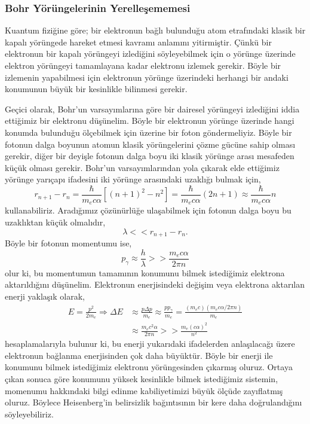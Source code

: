 \documentclass[00_kitap.tex]{subfiles}
\begin{document}
\subsubsection{Bohr Yörüngelerinin Yerelleşememesi}
Kuantum fiziğine göre; bir elektronun bağlı bulunduğu atom etrafındaki klasik bir kapalı yörüngede hareket etmesi kavramı anlamını yitirmiştir. Çünkü bir elektronun bir kapalı yörüngeyi izlediğini söyleyebilmek için o yörünge üzerinde elektron yörüngeyi tamamlayana kadar elektronu izlemek gerekir. Böyle bir izlemenin yapabilmesi için elektronun yörünge üzerindeki herhangi bir andaki konumunun büyük bir kesinlikle bilinmesi gerekir.

Geçici olarak, Bohr'un varsayımlarına göre bir dairesel yörüngeyi izlediğini iddia ettiğimiz bir elektronu düşünelim. Böyle bir elektronun yörünge üzerinde hangi konumda bulunduğu ölçebilmek için üzerine bir foton göndermeliyiz. Böyle bir fotonun dalga boyunun atomun klasik yörüngelerini çözme gücüne sahip olması gerekir, diğer bir deyişle fotonun dalga boyu iki klasik yörünge arası mesafeden küçük olması gerekir. Bohr'un varsayımlarından yola çıkarak elde ettiğimiz yörünge yarıçapı ifadesini iki yörünge arasındaki uzaklığı bulmak için,
\begin{equation*}
r _ { n + 1 } - r _ { n } = \frac { \hbar } { m _ { e } c \alpha } \left[ ( n + 1 ) ^ { 2 } - n ^ { 2 } \right] = \frac { \hbar } { m _ { e } c \alpha } (2n+1) \approx \frac { \hbar } { m _ { e } c \alpha } n
\end{equation*}
kullanabiliriz. Aradığımız çözünürlüğe ulaşabilmek için fotonun dalga boyu bu uzaklıktan küçük olmalıdır,
\begin{equation*}
\lambda << r _ { n + 1 } - r _ { n }.
\end{equation*}
Böyle bir fotonun momentumu ise,
\begin{equation*}
p_{ \gamma } \approx \frac { h } { \lambda } >> \frac { m _ { e } c \alpha } { 2\pi n }
\end{equation*}
olur ki, bu momentumun tamamının konumunu bilmek istediğimiz elektrona aktarıldığını düşünelim. Elektronun enerjisindeki değişim veya elektrona aktarılan enerji yaklaşık olarak,
\begin{align*}
E = \frac{p^2}{2m_e} \Rightarrow \Delta E &\approx \frac { p \Delta p } { m _ { e } } \approx \frac { p p _ { \gamma } } { m _ { e } } = \frac{(m_e c) (m_e c \alpha/2\pi n)}{m_e}\\
&\approx \frac { m_e c^2 \alpha} { 2\pi n } >> \frac { m _ { e } ( c \alpha ) ^ { 2 } } { n ^ { 2 } }
\end{align*}
hesaplamalarıyla bulunur ki, bu enerji yukarıdaki ifadelerden anlaşılacağı üzere elektronun bağlanma enerjisinden çok daha büyüktür. Böyle bir enerji ile konumunu bilmek istediğimiz elektronu yörüngesinden çıkarmış oluruz. Ortaya çıkan sonuca göre konumunu yüksek kesinlikle bilmek istediğimiz sistemin, momenumu hakkındaki bilgi edinme kabiliyetimizi büyük ölçüde zayıflatmış oluruz. Böylece Heisenberg'in belirsizlik bağıntısının bir kere daha doğrulandığını söyleyebiliriz.
\end{document}

